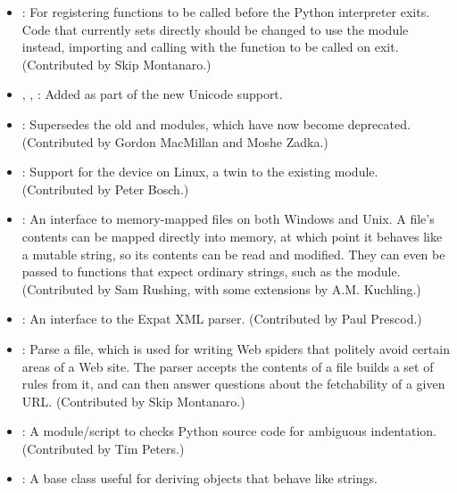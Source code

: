 \documentclass{howto}
\begin{document}
\begin{itemize}

\item{}: 
For registering functions to be called before the Python interpreter exits.
Code that currently sets
 directly should be changed to 
use the  module instead, importing 
and calling  with 
the function to be called on exit.
(Contributed by Skip Montanaro.)

\item{, , :}  Added as part of the new Unicode support. 

\item{:} Supersedes the old  and
 modules, which have now become deprecated.
(Contributed by Gordon MacMillan and Moshe Zadka.)

\item{:} Support for the  device on Linux,
a twin to the existing  module.
(Contributed by Peter Bosch.)

\item{:} An interface to memory-mapped files on both
Windows and Unix.  A file's contents can be mapped directly into
memory, at which point it behaves like a mutable string, so its
contents can be read and modified.  They can even be passed to
functions that expect ordinary strings, such as the 
module. (Contributed by Sam Rushing, with some extensions by
A.M. Kuchling.)

\item{:} An interface to the Expat XML parser.
(Contributed by Paul Prescod.)

\item{:} Parse a  file, which is
used for writing Web spiders that politely avoid certain areas of a
Web site.  The parser accepts the contents of a  file
builds a set of rules from it, and can then answer questions about
the fetchability of a given URL.  (Contributed by Skip Montanaro.)

\item{:} A module/script to 
checks Python source code for ambiguous indentation.
(Contributed by Tim Peters.)

\item{:} A base class useful for deriving objects that behave like strings.  


\end{itemize}
\end{document}

